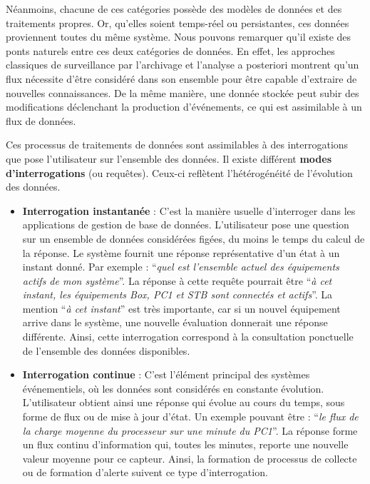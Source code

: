 Néanmoins, chacune de ces catégories possède des modèles de données et des traitements propres. Or, qu'elles soient temps-réel ou persistantes, ces données proviennent toutes du même système. Nous pouvons remarquer qu'il existe des ponts naturels entre ces deux catégories de données. En effet, les approches classiques de surveillance par l'archivage et l'analyse a posteriori montrent qu'un flux nécessite d'être considéré dans son ensemble pour être capable d'extraire de nouvelles connaissances. De la même manière, une donnée stockée peut subir des modifications déclenchant la production d'événements, ce qui est assimilable à un flux de données.

Ces processus de traitements de données sont assimilables à des interrogations que pose l'utilisateur sur l'ensemble des données. Il existe différent \textbf{modes d'interrogations} (ou requêtes). Ceux-ci reflètent l'hétérogénéité de l'évolution des données.
\begin{itemize}
    \item \textbf{Interrogation instantanée} : C'est la manière usuelle d'interroger dans les applications de gestion de base de données. L'utilisateur pose une question sur un ensemble de données considérées figées, du moins le temps du calcul de la réponse. Le système fournit une réponse représentative d'un état à un instant donné. Par exemple : \enquote{\it quel est l'ensemble actuel des équipements actifs de mon système}. La réponse à cette requête pourrait être \enquote{\it à cet instant, les équipements Box, PC1 et STB sont connectés et actifs}. La mention \enquote{\it à cet instant} est très importante, car si un nouvel équipement arrive dans le système, une nouvelle évaluation donnerait une réponse différente. Ainsi, cette interrogation correspond à la consultation ponctuelle de l'ensemble des données disponibles.
    \item \textbf{Interrogation continue} : C'est l'élément principal des systèmes événementiels, où les données sont considérés en constante évolution. L'utilisateur obtient ainsi une réponse qui évolue au cours du temps, sous forme de flux ou de mise à jour d'état. Un exemple pouvant être : \enquote{\it le flux de la charge moyenne du processeur sur une minute du PC1}. La réponse forme un flux continu d'information qui, toutes les minutes, reporte une nouvelle valeur moyenne pour ce capteur. Ainsi, la formation de processus de collecte ou de formation d'alerte suivent ce type d'interrogation.
\end{itemize}

